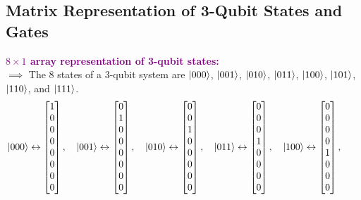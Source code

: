 \documentclass{book}
\begin{document}
\subsection{Matrix Representation of 3-Qubit States and Gates}
\textcolor{purple}{\textbf{$8 \times 1$ array representation of 3-qubit states:}}\\
$\implies$ The 8 states of a 3-qubit system are $\ket{000}$, $\ket{001}$, $\ket{010}$, $\ket{011}$, $\ket{100}$, $\ket{101}$, $\ket{110}$, and $\ket{111}$.\\
\begin{align*}
    & \ket{000} \leftrightarrow \begin{bmatrix} 1 \\ 0 \\ 0 \\ 0 \\ 0 \\ 0 \\ 0 \\ 0 \end{bmatrix}, \quad \ket{001} \leftrightarrow \begin{bmatrix} 0 \\ 1 \\ 0 \\ 0 \\ 0 \\ 0 \\ 0 \\ 0 \end{bmatrix}, \quad \ket{010} \leftrightarrow \begin{bmatrix} 0 \\ 0 \\ 1 \\ 0 \\ 0 \\ 0 \\ 0 \\ 0 \end{bmatrix}, \quad \ket{011} \leftrightarrow \begin{bmatrix} 0 \\ 0 \\ 0 \\ 1 \\ 0 \\ 0 \\ 0 \\ 0 \end{bmatrix}, \quad \ket{100} \leftrightarrow \begin{bmatrix} 0 \\ 0 \\ 0 \\ 0 \\ 1 \\ 0 \\ 0 \\ 0 \end{bmatrix}, \quad 
\end{align*}
\end{document}
